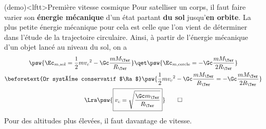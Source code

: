 \documentclass[../../main/main.tex]{subfiles}
\begin{document}
\begin{tcb*}(demo)<lftt>{Première vitesse cosmique}
	Pour satelliser un corps, il faut faire varier son \textbf{énergie mécanique}
	d'un état partant \textbf{du sol} jusqu'\textbf{en orbite}. La plus petite
	énergie mécanique pour cela est celle que l'on vient de déterminer dans
	l'étude de la trajectoire circulaire. Ainsi, à partir de l'énergie mécanique
	d'un objet lancé au niveau du sol, on a
	\begin{gather*}
		\psw{\Ec_{m,\rm sol} = \frac{1}{2}mv_c{}^2 -\Gc \frac{mM_\Ter}{R_\Ter}}
		\qet
		\psw{\Ec_{m,\rm cercle} = -\Gc \frac{mM_\Ter}{2R_\Ter}}
		\\
		\beforetext{Or système conservatif $\Ra$}
		\psw{
		\frac{1}{2}mv_c{}^2 -\Gc \frac{mM_\Ter}{R_\Ter} =
		-\Gc \frac{mM_\Ter}{2R_\Ter}
		}
		\\\Lra
		\psw{
			\boxed{v_c = \sqrt{\frac{\Gc m_\Ter}{R_\Ter}}}
		}
		\qed
	\end{gather*}
	Pour des altitudes plus élevées, il faut davantage de vitesse.
\end{tcb*}
\end{document}
